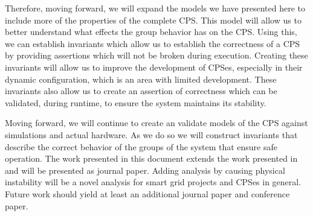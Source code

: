 Therefore, moving forward, we will expand the models we have presented here to include more of the properties of the complete CPS. This model will allow us to better understand what effects the group behavior has on the CPS. Using this, we can establish invariants which allow us to establish the correctness of a CPS by providing assertions which will not be broken during execution. Creating these invariants will allow us to improve the development of CPSes, especially in their dynamic configuration, which is an area with limited development. These invariants also allow us to create an assertion of correctness which can be validated, during runtime, to ensure the system maintains its stability.

Moving forward, we will continue to create an validate models of the CPS against simulations and actual hardware. As we do so we will construct invariants that describe the correct behavior of the groups of the system that ensure safe operation. The work presented in this document extends the work presented in \cite{CRITIS2012} and will be presented as journal paper. Adding analysis by causing physical instability will be a novel analysis for smart grid projects and CPSes in general. Future work should yield at least an additional journal paper and conference paper.

